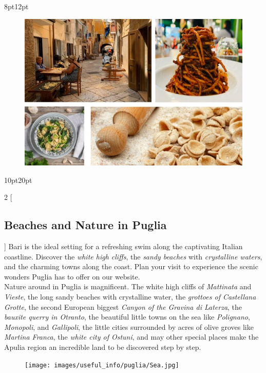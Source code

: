 \documentclass[
	openany, %
	parskip=full, %
	12pt, %
	a4paper, %
]{conferencebooklet} %
\begin{document}
\begin{adjustwidth}{8pt}{12pt}
\vspace{-4mm}
\begin{figure}[h!]
    \centering
    \includegraphics[width=0.96\linewidth]{images/useful_info/puglia/Immagine4.jpg}
\end{figure}
\end{adjustwidth}


\newpage
\begin{adjustwidth}{10pt}{20pt}
\begin{multicols}{2}
[\subsection*{Beaches and Nature in Puglia}]
Bari is the ideal setting for a refreshing swim along the captivating Italian coastline. Discover the \textit{white high cliffs}, the \textit{sandy beaches} with \textit{crystalline waters}, and the charming towns along the coast. Plan your visit to experience the scenic wonders Puglia has to offer on our website. \\
Nature around in Puglia is magnificent. The white high cliffs of \textit{Mattinata} and \textit{Vieste}, the long sandy beaches with crystalline water, the \textit{grottoes of Castellana Grotte}, the second European biggest \textit{Canyon of the Gravina di Laterza}, the \textit{bauxite querry in Otranto}, the beautiful little towns on the sea like \textit{Polignano}, \textit{Monopoli}, and \textit{Gallipoli}, the little cities surrounded by acres of olive groves like \textit{Martina Franca}, the \textit{white city of Ostuni}, and may other special places make the Apulia region an incredible land to be discovered step by step.
\end{multicols}

\vspace{-4mm}
\begin{figure}[h!]
    \centering
    \texttt{[image: images/useful\_info/puglia/Sea.jpg]}
\end{figure}
\end{adjustwidth}
\end{document}
